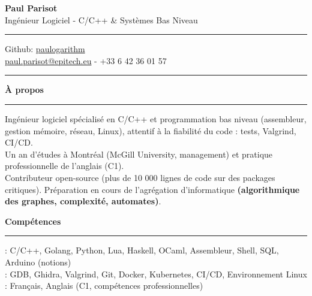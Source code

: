 \documentclass[9pt]{extarticle}
\begin{document}
\begin{center}
	{\huge\bfseries Paul Parisot}
	\\[4pt]
	{\Large Ingénieur Logiciel - C/C++ \& Systèmes Bas Niveau}
	\\
\end{center}

\par\vspace{-5pt}
\rule{\linewidth}{0.4pt}
\par\vspace{-5pt}

\begin{center}
	Github: \href{https://github.com/paulogarithm}{paulogarithm}
	\\
	\href{mailto:paul.parisot@epitech.eu}{paul.parisot@epitech.eu} - +33 6 42 36 01 57
	\\
\end{center}

\par\vspace{-10pt}
\rule{\linewidth}{0.4pt}
\par\vspace{7pt}

{\large\bfseries À propos}
\par\vspace{-8pt}
\rule{\linewidth}{0.4pt}
\par\vspace{5pt}

Ingénieur logiciel spécialisé en C/C++ et programmation bas niveau (assembleur, gestion mémoire, réseau, Linux), attentif à la fiabilité du code : tests, Valgrind, CI/CD.
\\
Un an d'études à Montréal (McGill University, management) et pratique professionnelle de l'anglais (C1).
\\
Contributeur open-source (plus de 10 000 lignes de code sur des packages critiques). Préparation en cours de l'agrégation d'informatique {\bfseries (algorithmique des graphes, complexité, automates)}.
\par\vspace{5pt}

{\large\bfseries Compétences}
\par\vspace{-8pt}
\rule{\linewidth}{0.4pt}
\par\vspace{5pt}

\hspace*{5pt}{\bfseries Maîtrise}: C/C++, Golang, Python, Lua, Haskell, OCaml, Assembleur, Shell, SQL, Arduino (notions)
\\
\hspace*{5pt}{\bfseries Outils}: GDB, Ghidra, Valgrind, Git, Docker, Kubernetes, CI/CD, Environnement Linux
\\
\hspace*{5pt}{\bfseries Langues}: Français, Anglais (C1, compétences professionnelles)
\end{document}
